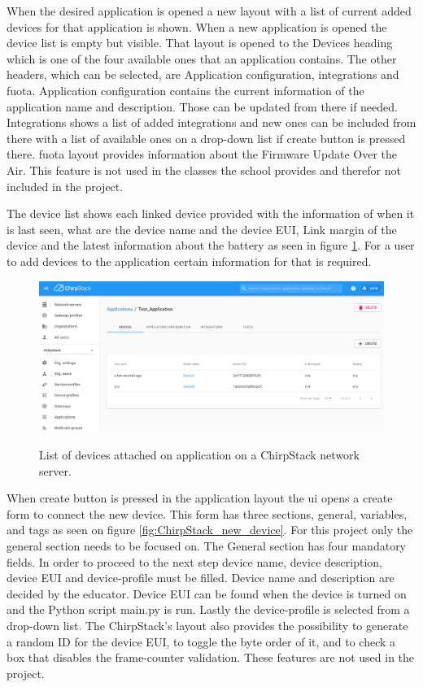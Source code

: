 When the desired application is opened a new layout with a list of current added devices for that application is shown.
When a new application is opened the device list is empty but visible.
That layout is opened to the Devices heading which is one of the four available ones that an application contains.
The other headers, which can be selected, are Application configuration, integrations and \gls{fuota}.
Application configuration contains the current information of the application name and description.
Those can be updated from there if needed.
Integrations shows a list of added integrations and new ones can be included from there with a list of available ones on a drop-down list if create button is pressed there.
\gls{fuota} layout provides information about the Firmware Update Over the Air.
This feature is not used in the classes the school provides and therefor not included in the project. 

The device list shows each linked device provided with the information of when it is last seen, what are the device name and the device EUI, Link margin of the device and the latest information about the battery as seen in figure \ref{fig:ChirpStack_application}.
For a user to add devices to the application certain information for that is required.

\begin{figure}[ht]
  \centering
  {\includegraphics[width=\textwidth]{illustration/ChirpStack_application.png}}
  \caption{List of devices attached on application on a ChirpStack network server.}
  \label{fig:ChirpStack_application}
\end{figure}

When create button is pressed in the application layout the \gls{ui} opens a create form to connect the new device.
This form has three sections, general, variables, and tags as seen on figure \ref{fig:ChirpStack_new_device}.
For this project only the general section needs to be focused on.
The General section has four mandatory fields.
In order to proceed to the next step device name, device description, device EUI and device-profile must be filled.
Device name and description are decided by the educator.
Device EUI can be found when the device is turned on and the Python script main.py is run.
Lastly the device-profile is selected from a drop-down list.
The ChirpStack's layout also provides the possibility to generate a random ID for the device EUI, to toggle the byte order of it, and to check a box that disables the frame-counter validation.
These features are not used in the project.


